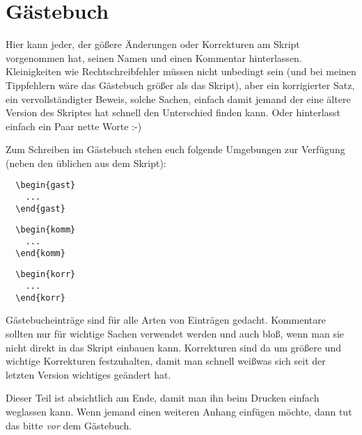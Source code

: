 \documentclass[paper = A4, fontsize=12pt, numbers=noendperiod, chapterprefix=true]{scrbook}
\theoremstyle{break}
\theoremstyle{nonumberbreak}
\newtheorem{gast}{G\"astebucheintrag}
\newtheorem{komm}{Kommentar}
\newtheorem{korr}{Korrktur}
\theoremstyle{nonumberplain}
\begin{document}
\chapter{G\"astebuch}
Hier kann jeder, der g\"o\ss ere \"Anderungen oder Korrekturen am Skript vorgenommen hat, seinen Namen und einen Kommentar hinterlassen. Kleinigkeiten wie Rechtschreibfehler m\"ussen nicht unbedingt sein (und bei meinen Tippfehlern w\"are das G\"astebuch gr\"o\ss er als das Skript), aber ein korrigierter Satz, ein vervollst\"andigter Beweis, solche Sachen, einfach damit jemand der eine \"altere Version des Skriptes hat schnell den Unterschied finden kann. Oder hinterlasst einfach ein Paar nette Worte :-)

Zum Schreiben im G\"astebuch stehen euch folgende Umgebungen zur Verf\"ugung (neben den \"ublichen aus dem Skript):
\begin{center}\begin{minipage}{0.3\textwidth}\begin{verbatim}
  \begin{gast}
    ...
  \end{gast}
\end{verbatim}\end{minipage}
\begin{minipage}{0.3\textwidth}\begin{verbatim}  
  \begin{komm}
    ...  
  \end{komm}
\end{verbatim}\end{minipage}
\begin{minipage}{0.3\textwidth}\begin{verbatim}  
  \begin{korr}
    ...  
  \end{korr}
\end{verbatim}\end{minipage}\end{center}
G\"astebucheintr\"age sind f\"ur alle Arten von Eintr\"agen gedacht. Kommentare sollten nur f\"ur wichtige Sachen verwendet werden und auch blo\ss,  wenn man sie nicht direkt in das Skript einbauen kann. Korrekturen sind da um gr\"o\ss ere und wichtige Korrekturen festzuhalten, damit man schnell wei\ss was sich seit der letzten Version wichtiges ge\"andert hat.

Dieser Teil ist absichtlich am Ende, damit man ihn beim Drucken einfach weglassen kann. Wenn jemand einen weiteren Anhang einf\"ugen m\"ochte, dann tut das bitte \emph{vor} dem G\"astebuch.\\
\end{document}
